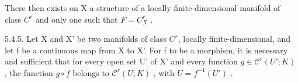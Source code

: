 There then exists on X a structure of a locally finite-dimensional manifold of class \(C^{r}\) and only one such that \(F = C_{X}^{r}\) .

5.4.5. Let X and X' be two manifolds of class \(C^{r}\), locally finite-dimensional, and let f be a continuous map from X to X'. For f to be a morphism, it is necessary and sufficient that for every open set U' of X' and every function \(g \in \mathcal{C}^{r}(U'; K)\) , the function \(g \circ f\) belongs to \(\mathcal{C}^{r}(U; K)\) , with \(U = f^{-1}(U')\) .

